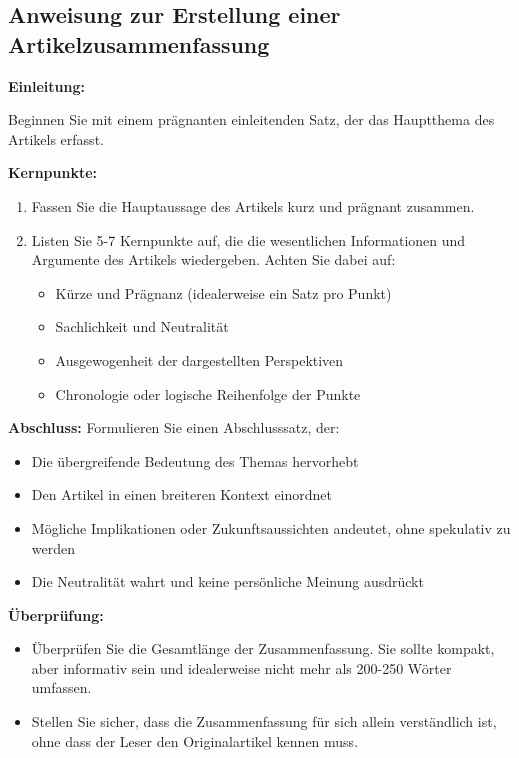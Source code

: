 \documentclass{vorlage-design-main}
\begin{document}
\subsection{Anweisung zur Erstellung einer
Artikelzusammenfassung}\label{anweisung-zur-erstellung-einer-artikelzusammenfassung}

\textbf{Einleitung:}

Beginnen Sie mit einem prägnanten einleitenden Satz, der das Hauptthema
des Artikels erfasst.

\textbf{Kernpunkte:}

\begin{enumerate}
\def\labelenumi{\arabic{enumi}.}

\item
  Fassen Sie die Hauptaussage des Artikels kurz und prägnant zusammen.
\item
  Listen Sie 5-7 Kernpunkte auf, die die wesentlichen Informationen und
  Argumente des Artikels wiedergeben. Achten Sie dabei auf:

  \begin{itemize}
  
  \item
    Kürze und Prägnanz (idealerweise ein Satz pro Punkt)
  \item
    Sachlichkeit und Neutralität
  \item
    Ausgewogenheit der dargestellten Perspektiven
  \item
    Chronologie oder logische Reihenfolge der Punkte
  \end{itemize}
\end{enumerate}

\textbf{Abschluss:} Formulieren Sie einen Abschlusssatz, der:

\begin{itemize}

\item
  Die übergreifende Bedeutung des Themas hervorhebt
\item
  Den Artikel in einen breiteren Kontext einordnet
\item
  Mögliche Implikationen oder Zukunftsaussichten andeutet, ohne
  spekulativ zu werden
\item
  Die Neutralität wahrt und keine persönliche Meinung ausdrückt
\end{itemize}

\textbf{Überprüfung:}

\begin{itemize}

\item
  Überprüfen Sie die Gesamtlänge der Zusammenfassung. Sie sollte
  kompakt, aber informativ sein und idealerweise nicht mehr als 200-250
  Wörter umfassen.
\item
  Stellen Sie sicher, dass die Zusammenfassung für sich allein
  verständlich ist, ohne dass der Leser den Originalartikel kennen muss.
\end{itemize}
\end{document}
